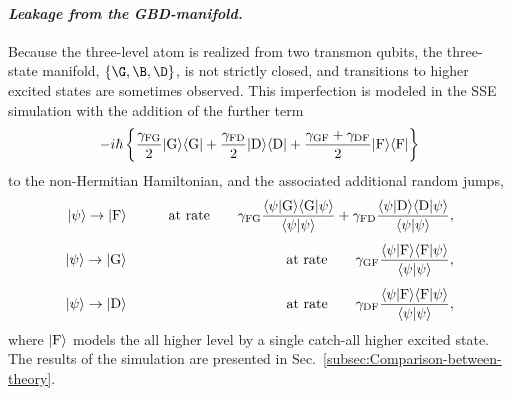 \paragraph{\textit{\emph{Leakage from the }}\emph{GBD}\textit{\emph{-manifold.}}\emph{ }}

Because the three-level atom is realized from two transmon qubits,
the three-state manifold, $\left\{ \G,\B,\D\right\} $, is not strictly
closed, and transitions to higher excited states are sometimes observed.
This imperfection is modeled in the SSE simulation with the addition
of the further term 
\[
-i\hbar\left\{ \frac{\gamma_{{\rm FG}}}{2}|{\rm G}\rangle\langle{\rm G}|+\frac{\gamma_{{\rm FD}}}{2}|{\rm D}\rangle\langle{\rm D}|+\frac{\gamma_{{\rm GF}}+\gamma_{{\rm DF}}}{2}|{\rm F}\rangle\langle{\rm F}|\right\} 
\]
to the non-Hermitian Hamiltonian, and the associated additional random
jumps, 
\begin{eqnarray}
|\psi\rangle\to|{\rm F}\rangle &  & \qquad\hbox{at\ rate}\qquad\gamma_{{\rm FG}}\frac{\langle\psi|{\rm G}\rangle\langle{\rm G}|\psi\rangle}{\langle\psi|\psi\rangle}+\gamma_{{\rm FD}}\frac{\langle\psi|{\rm D}\rangle\langle{\rm D}|\psi\rangle}{\langle\psi|\psi\rangle},\\
\noalign{\vskip4pt}|\psi\rangle\to|{\rm G}\rangle &  & \qquad\hbox{at\ rate}\qquad\gamma_{{\rm GF}}\frac{\langle\psi|{\rm F}\rangle\langle{\rm F}|\psi\rangle}{\langle\psi|\psi\rangle},\\
\noalign{\vskip4pt}|\psi\rangle\to|{\rm D}\rangle &  & \qquad\hbox{at\ rate}\qquad\gamma_{{\rm DF}}\frac{\langle\psi|{\rm F}\rangle\langle{\rm F}|\psi\rangle}{\langle\psi|\psi\rangle},\label{eqn:jumps_to_F}
\end{eqnarray}
where $|{\rm F}\rangle$ models the all higher level by a single catch-all
higher excited state. The results of the simulation are presented
in Sec.~\ref{subsec:Comparison-between-theory}.

